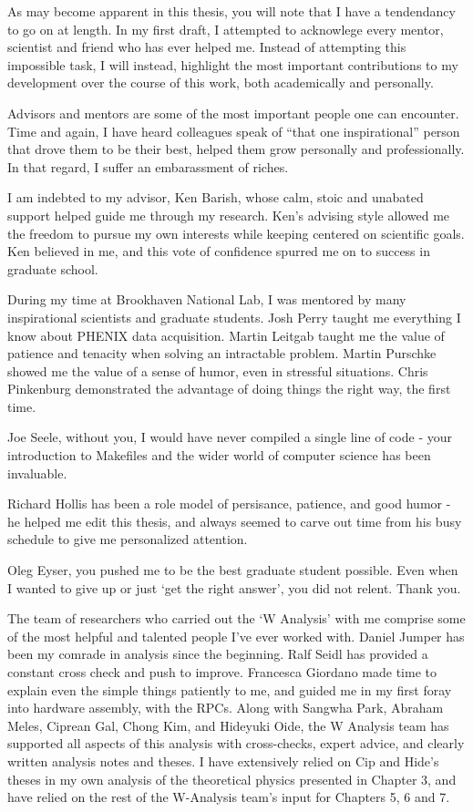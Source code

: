 As may become apparent in this thesis, you will note that I have a tendendancy
to go on at length. In my first draft, I attempted to acknowlege every mentor,
scientist and friend who has ever helped me. Instead of attempting this
impossible task, I will instead, highlight the most important contributions to
my development over the course of this work, both academically and personally.
 
Advisors and mentors are some of the most important people one can encounter.
Time and again, I have heard colleagues speak of ``that one inspirational''
person that drove them to be their best, helped them grow personally and
professionally. In that regard, I suffer an embarassment of riches.

I am indebted to my advisor, Ken Barish, whose calm, stoic and unabated support
helped guide me through my research. Ken's advising style allowed me the
freedom to pursue my own interests while keeping centered on scientific goals.
Ken believed in me, and this vote of confidence spurred me on to success in
graduate school.

During my time at Brookhaven National Lab, I was mentored by many inspirational
scientists and graduate students. Josh Perry taught me everything I know about
PHENIX data acquisition. Martin Leitgab taught me the value of patience and
tenacity when solving an intractable problem. Martin Purschke showed me the
value of a sense of humor, even in stressful situations. Chris Pinkenburg
demonstrated the advantage of doing things the right way, the first time.

Joe Seele, without you, I would have never compiled a single line of code -
your introduction to Makefiles and the wider world of computer science has been
invaluable. 

Richard Hollis has been a role model of persisance, patience, and good humor -
he helped me edit this thesis, and always seemed to carve out time from his
busy schedule to give me personalized attention.

Oleg Eyser, you pushed me to be the best graduate student possible. Even when I
wanted to give up or just `get the right answer', you did not relent. Thank you.

The team of researchers who carried out the `W Analysis' with me comprise some
of the most helpful and talented people I've ever worked with. Daniel Jumper
has been my comrade in analysis since the beginning. Ralf Seidl has provided a
constant cross check and push to improve. Francesca Giordano made time to
explain even the simple things patiently to me, and guided me in my first foray
into hardware assembly, with the RPCs. Along with Sangwha Park, Abraham Meles,
Ciprean Gal, Chong Kim, and Hideyuki Oide, the W Analysis team has supported
all aspects of this analysis with cross-checks, expert advice, and clearly
written analysis notes and theses. I have extensively relied on Cip and Hide's
theses in my own analysis of the theoretical physics presented in Chapter 3,
and have relied on the rest of the W-Analysis team's input for Chapters 5, 6
and 7. 

